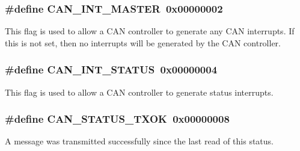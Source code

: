 \subsubsection[{\texorpdfstring{C\+A\+N\+\_\+\+I\+N\+T\+\_\+\+M\+A\+S\+T\+ER}{CAN_INT_MASTER}}]{\setlength{\rightskip}{0pt plus 5cm}\#define C\+A\+N\+\_\+\+I\+N\+T\+\_\+\+M\+A\+S\+T\+ER~0x00000002}\hypertarget{group__can__api_ga7e4406f4eca9ad39d1062708d4afdcb0}{}\label{group__can__api_ga7e4406f4eca9ad39d1062708d4afdcb0}
This flag is used to allow a C\+AN controller to generate any C\+AN interrupts. If this is not set, then no interrupts will be generated by the C\+AN controller. 
\subsubsection[{\texorpdfstring{C\+A\+N\+\_\+\+I\+N\+T\+\_\+\+S\+T\+A\+T\+US}{CAN_INT_STATUS}}]{\setlength{\rightskip}{0pt plus 5cm}\#define C\+A\+N\+\_\+\+I\+N\+T\+\_\+\+S\+T\+A\+T\+US~0x00000004}\hypertarget{group__can__api_ga9b574346c3ba9d87d77e39051c7361ef}{}\label{group__can__api_ga9b574346c3ba9d87d77e39051c7361ef}
This flag is used to allow a C\+AN controller to generate status interrupts. 
\subsubsection[{\texorpdfstring{C\+A\+N\+\_\+\+S\+T\+A\+T\+U\+S\+\_\+\+T\+X\+OK}{CAN_STATUS_TXOK}}]{\setlength{\rightskip}{0pt plus 5cm}\#define C\+A\+N\+\_\+\+S\+T\+A\+T\+U\+S\+\_\+\+T\+X\+OK~0x00000008}\hypertarget{group__can__api_gae8a21b993556fac574a61c600c41d860}{}\label{group__can__api_gae8a21b993556fac574a61c600c41d860}
A message was transmitted successfully since the last read of this status. 
